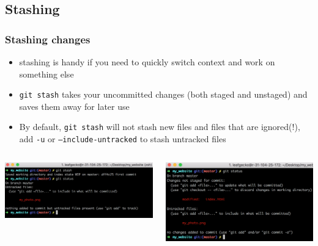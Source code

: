 \documentclass[12pt]{beamer}
\begin{document}
\subsection{Stashing}
\begin{frame}
\frametitle{Stashing changes}
\begin{itemize}
	\item stashing is handy if you need to quickly switch context and work on something else
	\item \texttt{git stash} takes your uncommitted changes (both staged and unstaged) and saves them away for later use
	\item By default, \texttt{git stash} will not stash new files and files that are ignored(!), add \texttt{-u} or \texttt{--include-untracked} to stash untracked files
\end{itemize}
\begin{columns}
	\begin{column}{0.5\linewidth}
		\includegraphics[width=\linewidth]{stash}
	\end{column}
	\begin{column}{0.5\linewidth}
		\includegraphics[width=\linewidth]{after_stash}
	\end{column}
\end{columns}
\end{frame}
\end{document}
